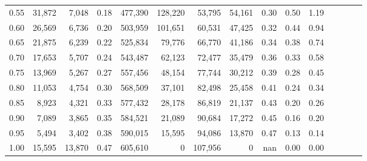 \begin{tabular}{rrrcrrrrrrrrrrr}
0.55 &  31,872 &   7,048 &                                       0.18 &  477,390 &  128,220 &   53,795 &   54,161 &  0.30 &  0.50 &                         1.19 \\
0.60 &  26,569 &   6,736 &                                       0.20 &  503,959 &  101,651 &   60,531 &   47,425 &  0.32 &  0.44 &                         0.94 \\
0.65 &  21,875 &   6,239 &                                       0.22 &  525,834 &   79,776 &   66,770 &   41,186 &  0.34 &  0.38 &                         0.74 \\
0.70 &  17,653 &   5,707 &                                       0.24 &  543,487 &   62,123 &   72,477 &   35,479 &  0.36 &  0.33 &                         0.58 \\
0.75 &  13,969 &   5,267 &                                       0.27 &  557,456 &   48,154 &   77,744 &   30,212 &  0.39 &  0.28 &                         0.45 \\
0.80 &  11,053 &   4,754 &                                       0.30 &  568,509 &   37,101 &   82,498 &   25,458 &  0.41 &  0.24 &                         0.34 \\
0.85 &   8,923 &   4,321 &                                       0.33 &  577,432 &   28,178 &   86,819 &   21,137 &  0.43 &  0.20 &                         0.26 \\
0.90 &   7,089 &   3,865 &                                       0.35 &  584,521 &   21,089 &   90,684 &   17,272 &  0.45 &  0.16 &                         0.20 \\
0.95 &   5,494 &   3,402 &                                       0.38 &  590,015 &   15,595 &   94,086 &   13,870 &  0.47 &  0.13 &                         0.14 \\
1.00 &  15,595 &  13,870 &                                       0.47 &  605,610 &        0 &  107,956 &        0 &   nan &  0.00 &                         0.00 \\
\bottomrule
\end{tabular}
